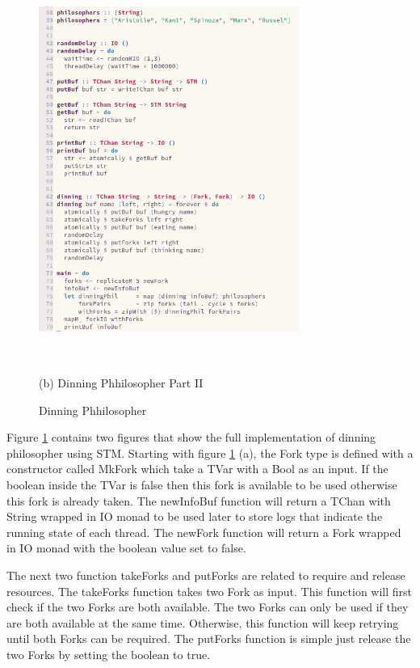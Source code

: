 \documentclass{article}
\begin{document}
\begin{normalsize}
\begin{figure}[H]
\begin{minipage}[b]{0.48\linewidth}
      \centerline{\includegraphics[width=8.5cm, height=12.5cm]{dinning2}}
      \centerline{ (b) Dinning Phhilosopher Part II }\medskip
    \end{minipage}
    \caption{Dinning Phhilosopher}
    \label{fig:dinning}
  \end{figure}

  Figure \ref{fig:dinning} contains two figures that show the full implementation of dinning philosopher using STM. Starting with figure
  \ref{fig:dinning} (a), the Fork type is defined with a constructor called
  MkFork which take a TVar with a Bool as an input. If the boolean inside the
  TVar is false then this fork is available to be used otherwise this fork is already taken. The newInfoBuf function will return a TChan with String wrapped in IO monad to be used later to store logs that indicate the running state of each thread. The newFork function will return a Fork wrapped in IO monad with the boolean value set to false.

  The next two function takeForks and putForks are related to require and release resources. The takeForks function takes two Fork as input. This function will first check if the two Forks are both available. The two Forks can only be used if they are both available at the same time. Otherwise, this function will keep retrying until both Forks can be required. The putForks function is simple just release the two Forks by setting the boolean to true.


\end{normalsize}
\end{document}
